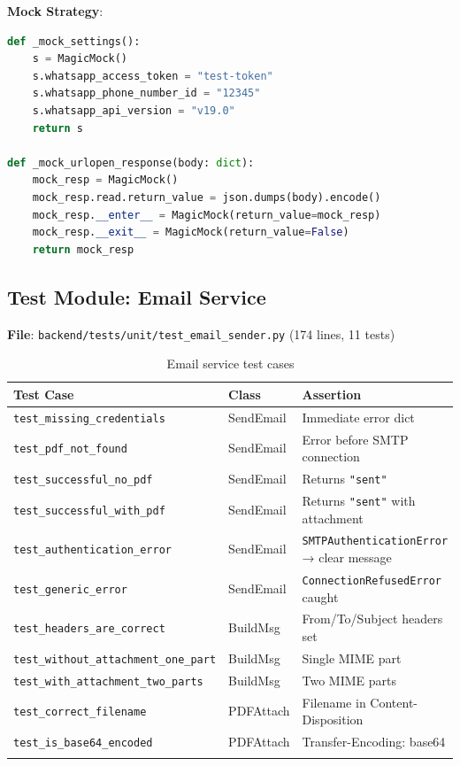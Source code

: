 \documentclass[12pt, a4paper]{article}
\newcommand{\file}[1]{\texttt{\color{accent}#1}}
\begin{document}
\textbf{Mock Strategy}:

\begin{lstlisting}[language=Python, caption={WhatsApp mock helpers}]
def _mock_settings():
    s = MagicMock()
    s.whatsapp_access_token = "test-token"
    s.whatsapp_phone_number_id = "12345"
    s.whatsapp_api_version = "v19.0"
    return s

def _mock_urlopen_response(body: dict):
    mock_resp = MagicMock()
    mock_resp.read.return_value = json.dumps(body).encode()
    mock_resp.__enter__ = MagicMock(return_value=mock_resp)
    mock_resp.__exit__ = MagicMock(return_value=False)
    return mock_resp
\end{lstlisting}

\subsection{Test Module: Email Service}
\label{sec:test_email}

\textbf{File}: \file{backend/tests/unit/test\_email\_sender.py} \quad (174 lines, 11 tests)

\begin{longtable}{p{5.5cm} p{2.5cm} p{5cm}}
  \toprule
  \textbf{Test Case} & \textbf{Class} & \textbf{Assertion} \\
  \midrule
  \texttt{test\_missing\_credentials}             & SendEmail & Immediate error dict \\
  \texttt{test\_pdf\_not\_found}                  & SendEmail & Error before SMTP connection \\
  \texttt{test\_successful\_no\_pdf}              & SendEmail & Returns \texttt{"sent"} \\
  \texttt{test\_successful\_with\_pdf}            & SendEmail & Returns \texttt{"sent"} with attachment \\
  \texttt{test\_authentication\_error}            & SendEmail & \texttt{SMTPAuthenticationError} → clear message \\
  \texttt{test\_generic\_error}                   & SendEmail & \texttt{ConnectionRefusedError} caught \\
  \texttt{test\_headers\_are\_correct}            & BuildMsg  & From/To/Subject headers set \\
  \texttt{test\_without\_attachment\_one\_part}   & BuildMsg  & Single MIME part \\
  \texttt{test\_with\_attachment\_two\_parts}     & BuildMsg  & Two MIME parts \\
  \texttt{test\_correct\_filename}                & PDFAttach & Filename in Content-Disposition \\
  \texttt{test\_is\_base64\_encoded}              & PDFAttach & Transfer-Encoding: base64 \\
  \bottomrule
  \caption{Email service test cases}
\end{longtable}
\end{document}
